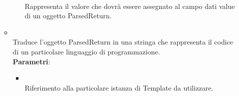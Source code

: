 \begin{itemize}
\begin{itemize}
\begin{itemize}
\\ Rappresenta il valore che dovrà essere assegnato al campo dati value di un oggetto ParsedReturn.
\end{itemize}
\item {}
\\ Traduce l'oggetto ParsedReturn in una stringa che rappresenta il codice di un particolare linguaggio di programmazione.
\\ \textbf{Parametri}:
\begin{itemize}
\item {}
\\ Riferimento alla particolare istanza di Template da utilizzare.
\end{itemize}
\end{itemize}
\end{itemize}

